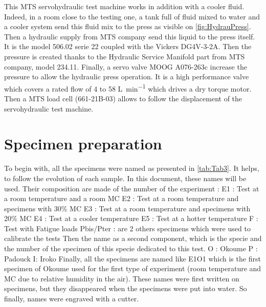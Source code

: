 This MTS servohydraulic test machine works in addition with a cooler fluid. Indeed, in a room close to the testing one, a tank full of fluid mixed to water and a cooler system send this fluid mix to the press as visible on \ref{fig:HydrauPress}. Then a hydraulic supply from MTS company send this liquid to the press itself. It is  the model 506.02 serie 22 coupled with the Vickers DG4V-3-2A. Then the pressure is created thanks to the Hydraulic Service Manifold part from MTS company, model 234.11. Finally, a servo valve MOOG A076-263c increase the pressure to allow the hydraulic press operation. It is a high performance valve which covers a rated flow of 4 to 58 \si{\liter\per\minute} which drives a dry torque motor. Then a MTS load cell (661-21B-03) allows to follow the displacement of the servohydraulic test machine. 


\section{Specimen preparation}

To begin with, all the specimens were named as presented in \ref{tab:Tab3}. It helps, to follow the evolution of each sample.
In this document, these names will be used. Their composition are made of the number of the experiment :
\newline
E1 : Test at a room temperature and a room MC
\newline
E2 : Test at a room temperature and specimens with 30\% MC
\newline
E3 : Test at a room temperature and specimens with 20\% MC
\newline
E4 : Test at a cooler temperature
\newline
E5 : Test at a hotter temperature
\newline
F : Test with Fatigue loads
\newline
Pbis/Pter : are 2 others specimens which were used to calibrate the tests
\newline
\newline
Then the name as a second component, which is the specie and the number of the specimen of this specie dedicated to this test.
\newline
O : Okoume
\newline
P : Padouck
\newline
I: Iroko
\newline
\newline
Finally, all the specimens are named like E1O1 which is the first specimen of Okoume used for the first type of experiment (room temperature and MC due to relative humidity in the air). These names were first written on specimens, but they disappeared when the specimens were put into water. So finally, names were engraved with a cutter.

